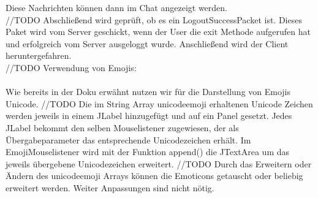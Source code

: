 \begin{itemize}
    Diese Nachrichten können dann im Chat angezeigt werden.\\
    //TODO
    Abschließend wird geprüft, ob es ein LogoutSuccessPacket ist. Dieses Paket wird vom Server geschickt, wenn der
    User die exit Methode aufgerufen hat und erfolgreich vom Server ausgeloggt wurde. Anschließend wird der Client
    heruntergefahren.\\
    //TODO
Verwendung von Emojis: \\\\
	Wie bereits in der Doku erwähnt nutzen wir für die Darstellung von Emojis Unicode.
	//TODO
	Die im String Array unicodeemoji erhaltenen Unicode Zeichen werden jeweils in einem JLabel hinzugefügt und auf ein Panel gesetzt. Jedes JLabel bekommt den selben Mouselistener zugewiesen, der als Übergabeparameter das entsprechende Unicodezeichen erhält. Im EmojiMouselistener wird mit der Funktion append() die JTextArea um das jeweils übergebene Unicodezeichen erweitert.
	//TODO
	Durch das Erweitern oder Ändern des unicodeemoji Arrays können die Emoticons getauscht oder beliebig erweitert werden. Weiter Anpassungen sind nicht nötig.
\end{itemize}


